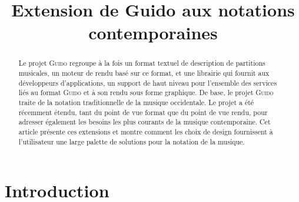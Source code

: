 \documentclass{article}
\title{\centering Extension de Guido aux notations contemporaines}
\newcommand{\guido}			{\textsc{Guido}}
\begin{document}

\maketitle

\begin{abstract}

Le projet \guido{} regroupe à la fois un format textuel de description de partitions musicales, un moteur de rendu basé sur ce format, et une librairie qui fournit aux développeurs d'applications, un support de haut niveau pour l'ensemble des services liés au format \guido{} et à son rendu sous forme graphique. 
De base, le projet \guido{} traite de la notation traditionnelle de la musique occidentale. Le projet a été récemment étendu, tant du point de vue format que du point de vue rendu, pour adresser également les besoins les plus courants de la musique contemporaine. Cet article présente ces extensions et montre comment les choix de design fournissent à l'utilisateur une large palette de solutions pour la notation de la musique. 


\end{abstract}


\section{Introduction}\label{sec:introduction}

% 
\end{document}
